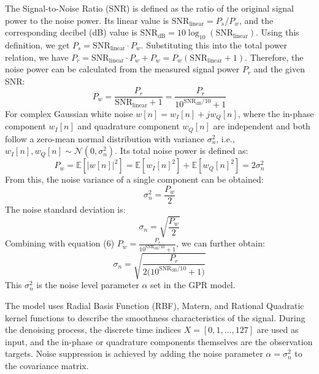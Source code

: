 \documentclass[conference]{IEEEtran}
\begin{document}
The Signal-to-Noise Ratio (SNR) is defined as the ratio of the original signal power to the noise power. Its linear value is $\mathrm{SNR}_{\text{linear}} = P_s/P_w$, and the corresponding decibel (dB) value is $\mathrm{SNR}_{\text{dB}} = 10\log_{10}(\mathrm{SNR}_{\text{linear}})$.
Using this definition, we get $P_s = \mathrm{SNR}_{\text{linear}} \cdot P_w$. Substituting this into the total power relation, we have $P_r = \mathrm{SNR}_{\text{linear}} \cdot P_w + P_w = P_w(\mathrm{SNR}_{\text{linear}} + 1)$.
Therefore, the noise power can be calculated from the measured signal power $P_r$ and the given SNR:
\begin{equation}
P_w = \frac{P_r}{\mathrm{SNR}_{\text{linear}} + 1} = \frac{P_r}{10^{\mathrm{SNR}_{\text{dB}}/10} + 1}
\end{equation}
For complex Gaussian white noise $w[n]=w_I[n]+jw_Q[n]$, where the in-phase component $w_I[n]$ and quadrature component $w_Q[n]$ are independent and both follow a zero-mean normal distribution with variance $\sigma_n^2$, i.e., $w_I[n],w_Q[n]\sim\mathcal{N}(0,\sigma_n^2)$. Its total noise power is defined as:
\begin{equation}
P_w=\mathbb{E}[|w[n]|^2]
=\mathbb{E}[w_I[n]^2]+\mathbb{E}[w_Q[n]^2]
=2\sigma_n^2
\end{equation}
From this, the noise variance of a single component can be obtained:
\begin{equation}
\sigma_n^2=\frac{P_w}{2}
\end{equation}
The noise standard deviation is:
\begin{equation}
\sigma_n=\sqrt{\frac{P_w}{2}}
\end{equation}
Combining with equation (6) $P_w=\frac{P_r}{10^{\mathrm{SNR}_{\mathrm{dB}}/10}+1}$, we can further obtain:
\begin{equation}
\sigma_n=\sqrt{\frac{P_r}{2\bigl(10^{\mathrm{SNR}_{\mathrm{dB}}/10}+1\bigr)}}
\end{equation}
\label{eq:sigma_n_calc}
This $\sigma_n^2$ is the noise level parameter $\alpha$ set in the GPR model.

The model uses Radial Basis Function (RBF), Matern, and Rational Quadratic kernel functions to describe the smoothness characteristics of the signal. During the denoising process, the discrete time indices $X=[0,1,\ldots,127]$ are used as input, and the in-phase or quadrature components themselves are the observation targets. Noise suppression is achieved by adding the noise parameter $\alpha=\sigma_n^2$ to the covariance matrix.
\end{document}
